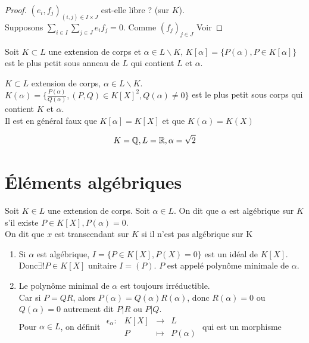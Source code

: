 \documentclass[]{report}
\begin{document}
    \begin{proof}
        $(e_i,f_j)_{(i,j)\in I\times J}$ est-elle libre ? (sur $K$).\\
        Supposons $\sum_{i\in I}\sum_{j\in J}e_i f_j=0$. Comme $(f_j)_{j\in J}$ Voir
    \end{proof}

    \begin{df}{}{}
        Soit $K\subset L$ une extension de corps et $\alpha \in L\backslash K$, $K[\alpha]=\{P(\alpha),P\in K[\alpha]\}$ est le plus petit sous anneau de $L$ qui contient $L$ et $\alpha$.
    \end{df}

    \begin{df}{}{}
        $K\subset L$ extension de corps, $\alpha\in L\backslash K$.\\
        $K(\alpha)=\{\frac{P(\alpha)}{Q(\alpha)},(P,Q)\in K[X]^2,Q(\alpha)\neq0\}$ est le plus petit sous corps qui contient $K$ et $\alpha$.\\
        Il est en général faux que $K[\alpha]=K[X]$ et que $K(\alpha)=K(X)$
    \end{df}

    \begin{ex}{}{}
        $$K=\mathbb{Q},L=\mathbb{R},\alpha=\sqrt2$$
    \end{ex}

    \section{Éléments algébriques}

    \begin{df}{}{}
        Soit $K\in L$ une extension de corps. Soit $\alpha\in L$. On dit que $\alpha$ est algébrique sur $K$ s'il existe $P\in K[X],P(\alpha)=0$.\\
        On dit que $x$ est transcendant sur $K$ si il n'est pas algébrique sur K
    \end{df}

    \begin{re}{}{}
        \begin{enumerate}
            \item Si $\alpha$ est algébrique, $I=\{P\in K[X],P(X)=0\}$ est un idéal de $K[X]$. Donc$\exists!P\in K[X]$ unitaire \tq $I=(P)$. $P$ est appelé polynôme minimale de $\alpha$.
            \item Le polynôme minimal de $\alpha$ est toujours irréductible.\\
            Car si $P=QR$, alors $P(\alpha)=Q(\alpha)R(\alpha)$, donc $R(\alpha)=0$ ou $Q(\alpha)=0$ autrement dit $P|R$ ou $P|Q$.\\
            Pour $\alpha\in L$, on définit $\begin{array}{ccccc}
    \epsilon_\alpha : & K[X] & \to & L \\
      & P & \mapsto & P(\alpha)
    \end{array}$ qui est un morphisme
        \end{enumerate}
    \end{re}
\end{document}
